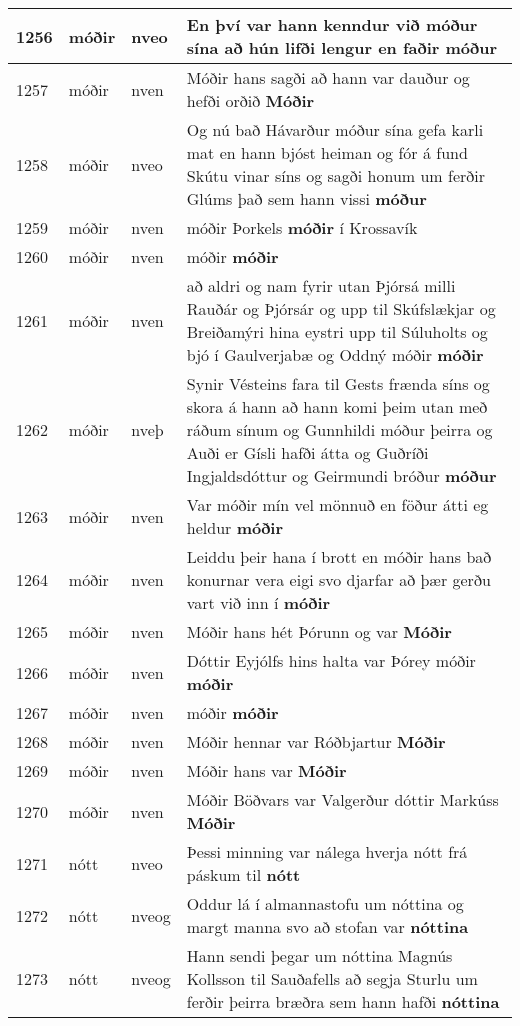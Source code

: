 \documentclass{article}
\begin{document}
\begin{longtable}{p{1cm}|p{1cm}|p{1cm}|p{13cm}}
\hline
1256&móðir&nveo&En því var hann kenndur við móður sína að hún lifði lengur en faðir \textbf{móður} \\
\hline
1257&móðir&nven&Móðir hans sagði að hann var dauður og hefði orðið \textbf{Móðir} \\
\hline
1258&móðir&nveo&Og nú bað Hávarður móður sína gefa karli mat en hann bjóst heiman og fór á fund Skútu vinar síns og sagði honum um ferðir Glúms það sem hann vissi \textbf{móður} \\
\hline
1259&móðir&nven&móðir Þorkels \textbf{móðir} í Krossavík\\
\hline
1260&móðir&nven&móðir \textbf{móðir} \\
\hline
1261&móðir&nven&að aldri og nam fyrir utan Þjórsá milli Rauðár og Þjórsár og upp til Skúfslækjar og Breiðamýri hina eystri upp til Súluholts og bjó í Gaulverjabæ og Oddný móðir \textbf{móðir} \\
\hline
1262&móðir&nveþ&Synir Vésteins fara til Gests frænda síns og skora á hann að hann komi þeim utan með ráðum sínum og Gunnhildi móður þeirra og Auði er Gísli hafði átta og Guðríði Ingjaldsdóttur og Geirmundi bróður \textbf{móður} \\
\hline
1263&móðir&nven&Var móðir mín vel mönnuð en föður átti eg heldur \textbf{móðir} \\
\hline
1264&móðir&nven&Leiddu þeir hana í brott en móðir hans bað konurnar vera eigi svo djarfar að þær gerðu vart við inn í \textbf{móðir} \\
\hline
1265&móðir&nven&Móðir hans hét Þórunn og var \textbf{Móðir} \\
\hline
1266&móðir&nven&Dóttir Eyjólfs hins halta var Þórey móðir \textbf{móðir} \\
\hline
1267&móðir&nven&móðir \textbf{móðir} \\
\hline
1268&móðir&nven&Móðir hennar var Róðbjartur \textbf{Móðir} \\
\hline
1269&móðir&nven&Móðir hans var \textbf{Móðir} \\
\hline
1270&móðir&nven&Móðir Böðvars var Valgerður dóttir Markúss \textbf{Móðir} \\
\hline
1271&nótt&nveo&Þessi minning var nálega hverja nótt frá páskum til \textbf{nótt} \\
\hline
1272&nótt&nveog&Oddur lá í almannastofu um nóttina og margt manna svo að stofan var \textbf{nóttina} \\
\hline
1273&nótt&nveog&Hann sendi þegar um nóttina Magnús Kollsson til Sauðafells að segja Sturlu um ferðir þeirra bræðra sem hann hafði \textbf{nóttina} \\

\end{longtable}
\end{document}

